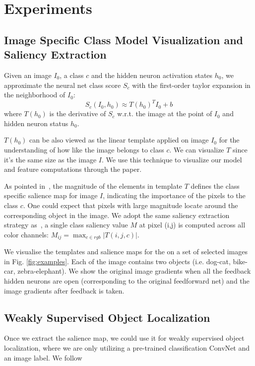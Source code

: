 \section{Experiments}
\label{sec:experiment}

\subsection{Image Specific Class Model Visualization and Saliency Extraction}
Given an image $I_0$, a class $c$ and the hidden neuron activation states $h_0$, we approximate the neural net class score $S_c$ with the first-order taylor expansion in the neighborhood of $I_0$:
\begin{equation}
  S_c(I_0, h_0) \approx  T(h_0)^T I_0 + b
\end{equation}
where $T(h_0)$ is the derivative of $S_c$ w.r.t. the image at the point of $I_0$ and hidden neuron status $h_0$.

$T(h_0)$ can be also viewed as the linear template applied on image $I_0$ for the understanding of how like the image belongs to class $c$. We can visualize $T$ since it's the same size as the image $I$. We use this technique to visualize our model and feature computations through the paper.

As pointed in~\cite{xxx}, the magnitude of the elements in template $T$ defines the class specific salience map for image $I$, indicating the importance of the pixels to the class $c$. One could expect that pixels with large magnitude locate around the corresponding object in the image. We adopt the same saliency extraction strategy as~\cite{xxx}, a single class saliency value $M$ at pixel (i,j) is computed across all color channels: $M_{ij} = \max_{c \in rgb} | T(i,j,c) |$.

We visualise the templates and salience maps for the  on a set of selected images in Fig. \ref{fig:examples}. Each of the image contains two objects (i.e. dog-cat, bike-car, zebra-elephant). We show the original image gradients when all the feedback hidden neurons are open (corresponding to the original feedforward net) and the image gradients after feedback is taken.

\subsection{Weakly Supervised Object Localization}
Once we extract the salience map, we could use it for weakly supervised object localization, where we are only utilizing a pre-trained classification ConvNet and an image label. We follow~\cite{xxx}

